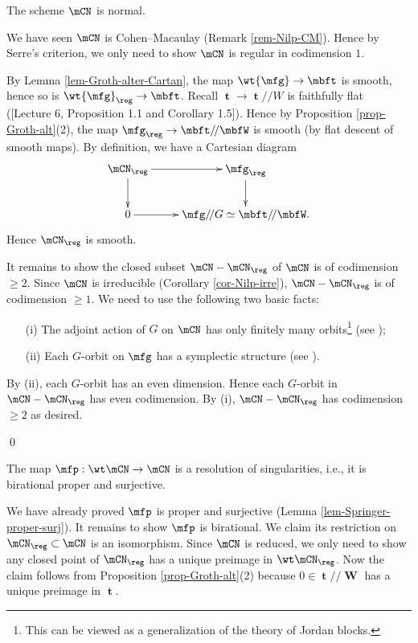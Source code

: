 	
	\begin{prop}
		The scheme $\mCN$ is normal.
	\end{prop}

	\proof[Sketch]
		We have seen $\mCN$ is Cohen--Macaulay (Remark \ref{rem-Nilp-CM}). Hence by Serre's criterion, we only need to show $\mCN$ is regular in codimension $1$. 

		By Lemma \ref{lem-Groth-alter-Cartan}, the map $\wt{\mfg} \to \mbft$ is smooth, hence so is $\wt{\mfg}_\reg \to \mbft$. Recall $\mbft\to \mbft/\!/W$ is faithfully flat ([Lecture 6, Proposition 1.1 and Corollary 1.5]). Hence by Proposition \ref{prop-Groth-alt}(2), the map $\mfg_\reg \to \mbft/\!/\mbfW$ is smooth (by flat descent of smooth maps). By definition, we have a Cartesian diagram
		\[
			\xymatrix{
				\mCN_\reg \ar[r] \ar[d] & \mfg_\reg \ar[d] \\
				0 \ar[r] & \mfg/\!/G \simeq \mbft/\!/\mbfW.
			}
		\]
		Hence $\mCN_\reg$ is smooth.

		It remains to show the closed subset $\mCN-\mCN_\reg$ of $\mCN$ is of codimension $\ge 2$. Since $\mCN$ is irreducible (Corollary \ref{cor-Nilp-irre}), $\mCN-\mCN_\reg$ is of codimension $\ge 1$. We need to use the following two basic facts:
		\begin{itemize}
			\item[(i)]
				The adjoint action of $G$ on $\mCN$ has only finitely many orbits\footnote{This can be viewed as a generalization of the theory of Jordan blocks.} (see \cite[Proposition 3.2.9]{CG});
			\item[(ii)]
				Each $G$-orbit on $\mfg$ has a symplectic structure (see \cite[Proposition 1.1.5]{CG}).
		\end{itemize}
		By (ii), each $G$-orbit has an even dimension. Hence each $G$-orbit in $\mCN-\mCN_\reg$ has even codimension. By (i), $\mCN-\mCN_\reg$ has codimension $\ge 2$ as desired.

	\qed

	\begin{cor}
		The map $\mfp:\wt\mCN \to \mCN$ is a resolution of singularities, i.e., it is birational proper and surjective.
	\end{cor}

	\proof
		We have already proved $\mfp$ is proper and surjective (Lemma \ref{lem-Springer-proper-surj}). It remains to show $\mfp$ is birational. We claim its restriction on $\mCN_\reg\subset \mCN$ is an isomorphism. Since $\mCN$ is reduced, we only need to show any closed point of $\mCN_\reg$ has a unique preimage in $\wt\mCN_\reg$. Now the claim follows from Proposition \ref{prop-Groth-alt}(2) because $0\in \mbft/\!/\mbfW$ has a unique preimage in $\mbft$.

